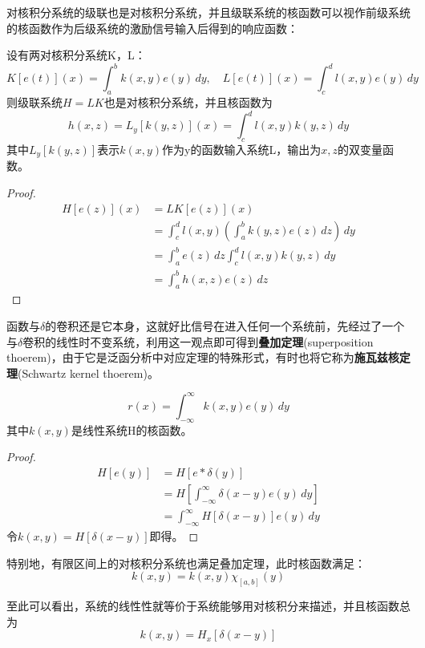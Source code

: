 对核积分系统的级联也是对核积分系统，并且级联系统的核函数可以视作前级系统的核函数作为后级系统的激励信号输入后得到的响应函数：
\begin{proposition}[对核积分系统的级联]
    设有两对核积分系统K，L：
    \[K[e(t)](x)=\int_{a}^{b}k(x,y)e(y)\,dy,\quad L[e(t)](x)=\int_{c}^{d}l(x,y)e(y)\,dy\]
则级联系统$H=LK$也是对核积分系统，并且核函数为\begin{equation*}
    h(x,z)=L_y[k(y,z)](x)=\int_{c}^{d}l(x,y)k(y,z)\,dy
\end{equation*}
其中$L_y[k(y,z)]$表示$k(x,y)$作为y的函数输入系统L，输出为$x,z$的双变量函数。
\end{proposition}

\begin{proof}\begin{align*}
    H[e(z)](x)&=LK[e(z)](x)\\
    &=\int_{c}^{d}l(x,y)\left(\int_{a}^{b}k(y,z)e(z)\,dz\right)\,dy\\
    &=\int_{a}^{b}e(z)\,dz\int_{c}^{d}l(x,y)k(y,z)\,dy\\
    &=\int_{a}^{b}h(x,z)e(z)\,dz
\end{align*}
\end{proof}

函数与$\delta$的卷积还是它本身，这就好比信号在进入任何一个系统前，先经过了一个与$\delta$卷积的线性时不变系统，利用这一观点即可得到\textbf{叠加定理}(superposition thoerem)\cite{brad_osgood_ee261}，由于它是泛函分析中对应定理的特殊形式，有时也将它称为\textbf{施瓦兹核定理}(Schwartz kernel thoerem)。
\begin{theorem}\label{thm:superposition}
    \begin{equation*}
        r(x)=\int_{-\infty}^{\infty}k(x,y)e(y)\,dy
    \end{equation*}
其中$k(x,y)$是线性系统H的核函数。
\end{theorem}
\begin{proof}\begin{align*}
    H[e(y)]&=H[e*\delta(y)]\\
    &=H\left[\int_{-\infty}^{\infty}\delta(x-y)e(y)\,dy\right]\\
    &=\int_{-\infty}^{\infty}H[\delta(x-y)]e(y)\,dy
\end{align*}
令$k(x,y)=H[\delta(x-y)]$即得。
\end{proof}

特别地，有限区间上的对核积分系统也满足叠加定理，此时核函数满足：
\[k(x,y)=k(x,y)\chi_{[a,b]}(y)\]

至此可以看出，系统的线性性就等价于系统能够用对核积分来描述，并且核函数总为
$$k(x,y)=H_x[\delta(x-y)]$$

